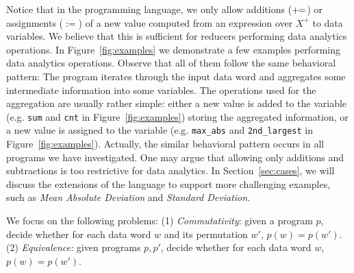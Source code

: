 

Notice that in the programming language, we only allow additions ($+\!\!=$) or assignments ($:=$) of a new value computed from an expression over $X^+$ to data variables. 
We believe that this is sufficient for reducers performing data analytics operations.
In Figure~\ref{fig:examples} we demonstrate a few examples performing data analytics operations. Observe that all of them follow the same behavioral pattern: The program iterates through the input data word and aggregates some intermediate information into some variables. The operations used for the aggregation are usually rather simple: either a new value is added to the variable (e.g. \texttt{sum} and \texttt{cnt} in Figure~\ref{fig:examples}) storing the aggregated information, or a new value is assigned to the variable (e.g. \texttt{max\_abs} and \texttt{2nd\_largest} in Figure~\ref{fig:examples}). Actually, the similar behavioral pattern occurs in all programs we have investigated.
One may argue that allowing only additions and subtractions is too restrictive for data analytics. 
In Section~\ref{sec:cases}, we will discuss the extensions of the language to support more challenging examples, such as \emph{Mean Absolute Deviation} and \emph{Standard Deviation}.


 

We focus on the following problems: (1) \emph{Commutativity}: given a program $p$, decide whether for each data word $w$ and its permutation $w'$, $p(w) = p(w')$. (2) \emph{Equivalence:} given programs $p,p'$, decide whether for each data word $w$, $p(w)=p(w')$.





